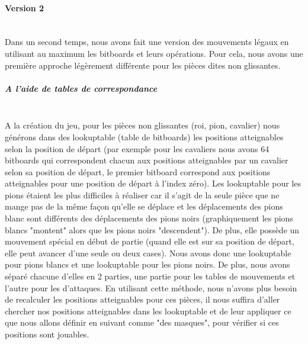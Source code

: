 \huge\documentclass{article}
\begin{document}
\paragraph{Version 2} \label{mouvements_legaux_v2}
~~\\
\newline
Dans un second temps, nous avons fait une version des mouvements légaux en utilisant au maximum les bitboards et leurs opérations.
Pour cela, nous avons une première approche légèrement différente pour les pièces dites non glissantes.
\subparagraph{A l'aide de tables de correspondance} \label{tables_de_correspondances}
~~\\
\newline
A la création du jeu, pour les pièces non glissantes (roi, pion, cavalier) nous générons dans des lookuptable (table de bitboards) les positions atteignables selon la position de départ (par exemple pour les cavaliers nous avons 64 bitboards qui correspondent chacun aux positions atteignables par un cavalier selon sa position de départ, le premier bitboard correspond aux positions atteignables pour une position de départ à l'index zéro).\newline
Les lookuptable pour les pions étaient les plus difficiles à réaliser car il s'agit de la seule pièce que ne mange pas de la même façon qu'elle se déplace et les déplacements des pions blanc sont différents des déplacements des pions noirs (graphiquement les pions blancs "montent" alors que les pions noirs "descendent"). \newline
De plus, elle possède un mouvement spécial en début de partie (quand elle est sur sa position de départ, elle peut avancer d'une seule ou deux cases).\newline
Nous avons donc une lookuptable pour pions blancs et une lookuptable pour les pions noirs.\newline
De plus, nous avons séparé chacune d'elles en 2 parties, une partie pour les tables de mouvements et l'autre pour les d'attaques.\newline
En utilisant cette méthode, nous n'avons plus besoin de recalculer les positions atteignables pour ces pièces, il nous suffira d'aller chercher nos positions atteignables dans les lookuptable et de leur appliquer ce que nous allons définir en suivant comme "des masques", pour vérifier si ces positions sont jouables.
\end{document}
